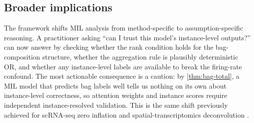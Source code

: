 \subsection{Broader implications}

The framework shifts MIL analysis from method-specific to
assumption-specific reasoning. A practitioner asking ``can I trust
this model's instance-level outputs?'' can now answer by checking
whether the rank condition holds for the bag-composition structure,
whether the aggregation rule is plausibly deterministic OR, and
whether any instance-level labels are available to break the
firing-rate confound. The most actionable consequence is a caution:
by \cref{thm:bag-total}, a MIL model that predicts bag labels well
tells us nothing on its own about instance-level correctness, so
attention weights and instance scores require independent
instance-resolved validation. This is the same shift previously
achieved for scRNA-seq zero inflation
\citep{towell2026scrnacoarsening} and spatial-transcriptomics
deconvolution \citep{towell2026spatialcoarsening}.
